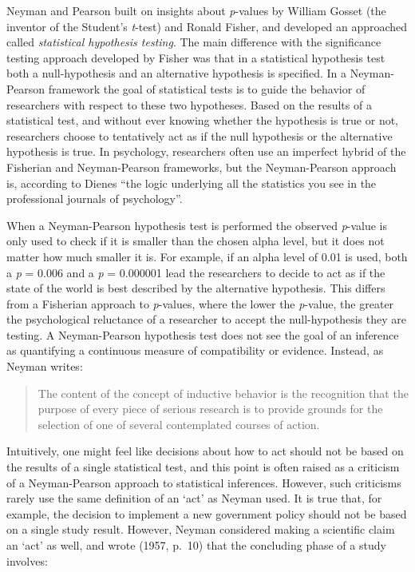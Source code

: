 \documentclass[
]{krantz}
\begin{document}
Neyman and Pearson built on insights about \emph{p}-values by William Gosset (the inventor of the Student's \emph{t}-test) and Ronald Fisher, and developed an approached called \emph{statistical hypothesis testing}. The main difference with the significance testing approach developed by Fisher was that in a statistical hypothesis test both a null-hypothesis and an alternative hypothesis is specified. In a Neyman-Pearson framework the goal of statistical tests is to guide the behavior of researchers with respect to these two hypotheses. Based on the results of a statistical test, and without ever knowing whether the hypothesis is true or not, researchers choose to tentatively act as if the null hypothesis or the alternative hypothesis is true. In psychology, researchers often use an imperfect hybrid of the Fisherian and Neyman-Pearson frameworks, but the Neyman-Pearson approach is, according to Dienes \citet{dienes_understanding_2008} ``the logic underlying all the statistics you see in the professional journals of psychology''.

When a Neyman-Pearson hypothesis test is performed the observed \emph{p}-value is only used to check if it is smaller than the chosen alpha level, but it does not matter how much smaller it is. For example, if an alpha level of 0.01 is used, both a \emph{p} = 0.006 and a \emph{p} = 0.000001 lead the researchers to decide to act as if the state of the world is best described by the alternative hypothesis. This differs from a Fisherian approach to \emph{p}-values, where the lower the \emph{p}-value, the greater the psychological reluctance of a researcher to accept the null-hypothesis they are testing. A Neyman-Pearson hypothesis test does not see the goal of an inference as quantifying a continuous measure of compatibility or evidence. Instead, as Neyman \citeyearpar{neyman_inductive_1957} writes:

\begin{quote}
The content of the concept of inductive behavior is the recognition that the purpose of every piece of serious research is to provide grounds for the selection of one of several contemplated courses of action.
\end{quote}

Intuitively, one might feel like decisions about how to act should not be based on the results of a single statistical test, and this point is often raised as a criticism of a Neyman-Pearson approach to statistical inferences. However, such criticisms rarely use the same definition of an `act' as Neyman used. It is true that, for example, the decision to implement a new government policy should not be based on a single study result. However, Neyman considered making a scientific claim an `act' as well, and wrote (1957, p.~10) that the concluding phase of a study involves:
\end{document}
